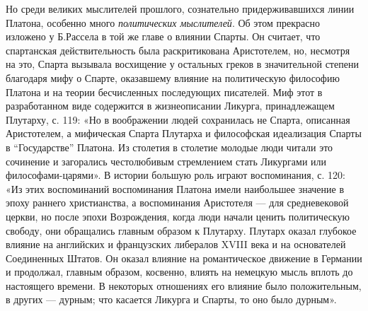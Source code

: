 Но  среди великих  мыслителей  прошлого, сознательно  придерживавшихся
линии  Платона, особенно  много  \textit{политических мыслителей}.  Об
этом прекрасно изложено  у Б.Рассела в той же главе  о влиянии Спарты.
Он  считает,  что  спартанская  действительность  была  раскритикована
Аристотелем,  но,  несмотря  на  это,  Спарта  вызывала  восхищение  у
остальных  греков  в значительной  степени  благодаря  мифу о  Спарте,
оказавшему  влияние  на политическую  философию  Платона  и на  теории
бесчисленных  последующих писателей.  Миф  этот  в разработанном  виде
содержится в  жизнеописании Ликурга,  принадлежащем Плутарху,  с. 119:
«Но в воображении людей  сохранилась не Спарта, описанная Аристотелем,
а  мифическая  Спарта  Плутарха  и философская  идеализация  Спарты  в
``Государстве'' Платона.  Из столетия  в столетие молодые  люди читали
это сочинение  и загорались  честолюбивым стремлением  стать Ликургами
или философами-царями». В истории большую роль играют воспоминания, с.
120:  «Из  этих  воспоминаний воспоминания  Платона  имели  наибольшее
значение в  эпоху раннего христианства, а  воспоминания Аристотеля ---
для  средневековой  церкви, но  после  эпохи  Возрождения, когда  люди
начали ценить  политическую свободу, они обращались  главным образом к
Плутарху. Плутарх оказал глубокое  влияние на английских и французских
либералов XVIII  века и на  основателей Соединенных Штатов.  Он оказал
влияние  на романтическое  движение  в Германии  и продолжал,  главным
образом,  косвенно,  влиять на  немецкую  мысль  вплоть до  настоящего
времени.  В некоторых  отношениях  его влияние  было положительным,  в
других --- дурным; что касается Ликурга и Спарты, то оно было дурным».

